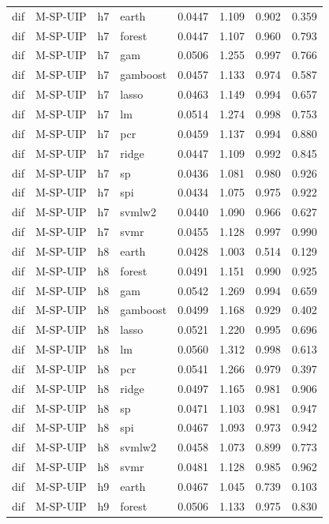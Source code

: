 \begin{ThreePartTable}
\begin{longtable}[t]{llclcccc}
dif & M-SP-UIP & h7 & earth & 0.0447 & 1.109 & 0.902 & 0.359\\
dif & M-SP-UIP & h7 & forest & 0.0447 & 1.107 & 0.960 & 0.793\\
dif & M-SP-UIP & h7 & gam & 0.0506 & 1.255 & 0.997 & 0.766\\
dif & M-SP-UIP & h7 & gamboost & 0.0457 & 1.133 & 0.974 & 0.587\\
dif & M-SP-UIP & h7 & lasso & 0.0463 & 1.149 & 0.994 & 0.657\\
dif & M-SP-UIP & h7 & lm & 0.0514 & 1.274 & 0.998 & 0.753\\
dif & M-SP-UIP & h7 & pcr & 0.0459 & 1.137 & 0.994 & 0.880\\
dif & M-SP-UIP & h7 & ridge & 0.0447 & 1.109 & 0.992 & 0.845\\
dif & M-SP-UIP & h7 & sp & 0.0436 & 1.081 & 0.980 & 0.926\\
dif & M-SP-UIP & h7 & spi & 0.0434 & 1.075 & 0.975 & 0.922\\
dif & M-SP-UIP & h7 & svmlw2 & 0.0440 & 1.090 & 0.966 & 0.627\\
dif & M-SP-UIP & h7 & svmr & 0.0455 & 1.128 & 0.997 & 0.990\\
\addlinespace
dif & M-SP-UIP & h8 & earth & 0.0428 & 1.003 & 0.514 & 0.129\\
dif & M-SP-UIP & h8 & forest & 0.0491 & 1.151 & 0.990 & 0.925\\
dif & M-SP-UIP & h8 & gam & 0.0542 & 1.269 & 0.994 & 0.659\\
dif & M-SP-UIP & h8 & gamboost & 0.0499 & 1.168 & 0.929 & 0.402\\
dif & M-SP-UIP & h8 & lasso & 0.0521 & 1.220 & 0.995 & 0.696\\
dif & M-SP-UIP & h8 & lm & 0.0560 & 1.312 & 0.998 & 0.613\\
dif & M-SP-UIP & h8 & pcr & 0.0541 & 1.266 & 0.979 & 0.397\\
dif & M-SP-UIP & h8 & ridge & 0.0497 & 1.165 & 0.981 & 0.906\\
dif & M-SP-UIP & h8 & sp & 0.0471 & 1.103 & 0.981 & 0.947\\
dif & M-SP-UIP & h8 & spi & 0.0467 & 1.093 & 0.973 & 0.942\\
dif & M-SP-UIP & h8 & svmlw2 & 0.0458 & 1.073 & 0.899 & 0.773\\
dif & M-SP-UIP & h8 & svmr & 0.0481 & 1.128 & 0.985 & 0.962\\
\addlinespace
dif & M-SP-UIP & h9 & earth & 0.0467 & 1.045 & 0.739 & 0.103\\
dif & M-SP-UIP & h9 & forest & 0.0506 & 1.133 & 0.975 & 0.830\\

\end{longtable}
\end{ThreePartTable}
